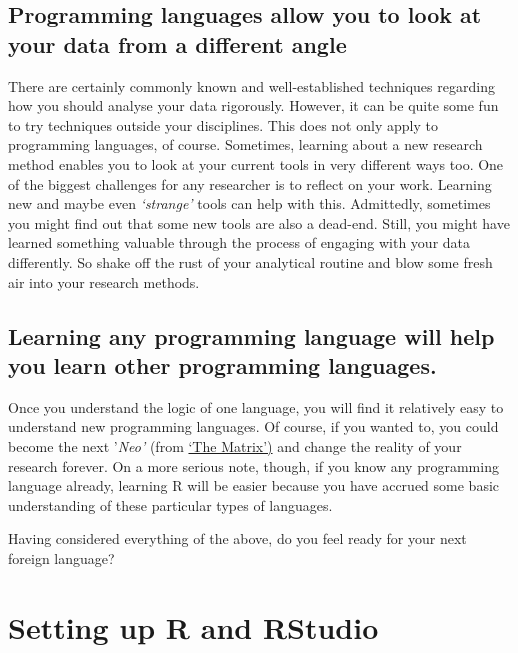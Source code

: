 \documentclass[
]{book}
\begin{document}
\hypertarget{programming-languages-allow-you-to-look-at-your-data-from-a-different-angle}{%
\section{Programming languages allow you to look at your data from a different angle}\label{programming-languages-allow-you-to-look-at-your-data-from-a-different-angle}}

There are certainly commonly known and well-established techniques regarding how you should analyse your data rigorously. However, it can be quite some fun to try techniques outside your disciplines. This does not only apply to programming languages, of course. Sometimes, learning about a new research method enables you to look at your current tools in very different ways too. One of the biggest challenges for any researcher is to reflect on your work. Learning new and maybe even \emph{`strange'} tools can help with this. Admittedly, sometimes you might find out that some new tools are also a dead-end. Still, you might have learned something valuable through the process of engaging with your data differently. So shake off the rust of your analytical routine and blow some fresh air into your research methods.

\hypertarget{learning-any-programming-language-will-help-you-learn-other-programming-languages.}{%
\section{Learning any programming language will help you learn other programming languages.}\label{learning-any-programming-language-will-help-you-learn-other-programming-languages.}}

Once you understand the logic of one language, you will find it relatively easy to understand new programming languages. Of course, if you wanted to, you could become the next '\emph{Neo'} (from \href{https://www.imdb.com/title/tt0133093/?ref_=ext_shr_lnk}{`The Matrix')} and change the reality of your research forever. On a more serious note, though, if you know any programming language already, learning R will be easier because you have accrued some basic understanding of these particular types of languages.

Having considered everything of the above, do you feel ready for your next foreign language?

\hypertarget{setting-up-r-and-rstudio}{%
\chapter{Setting up R and RStudio}\label{setting-up-r-and-rstudio}}
\end{document}
